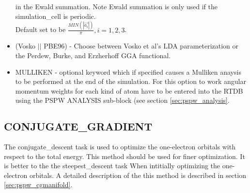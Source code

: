 \begin{itemize}
			  in the Ewald summation.  Note Ewald summation
                          is only used if the simulation\_cell is periodic. \\
                          Default set to be
		          $\frac{MIN(\left| \vec{a_i} \right|)}{\pi}, i=1,2,3$.
        \item (Vosko $||$ PBE96) - Choose between Vosko et al's LDA 
                               parameterization or the Perdew, Burke, 
                               and Erzherhoff GGA functional.
        \item MULLIKEN - optional keyword which if specified
                         causes a Mulliken anaysis to be performed at
                         the end of the simulation.  For this option
	                 to work angular momentum weights for each kind
                         of atom have to be entered into the RTDB using
                         the PSPW ANALYSIS sub-block (see section \ref{sec:pspw_analysis}.
\end{itemize}


\subsection{CONJUGATE\_GRADIENT} 

The conjugate\_descent task is used to optimize the one-electron orbitals
with respect to the total energy.  This method should be used for finer
optimization. It is better to the the steepest\_descent task When intitially 
optimizing the one-electron orbitals.  A detailed description of the this method
is described in section \ref{sec:pspw_cgmanifold}.


